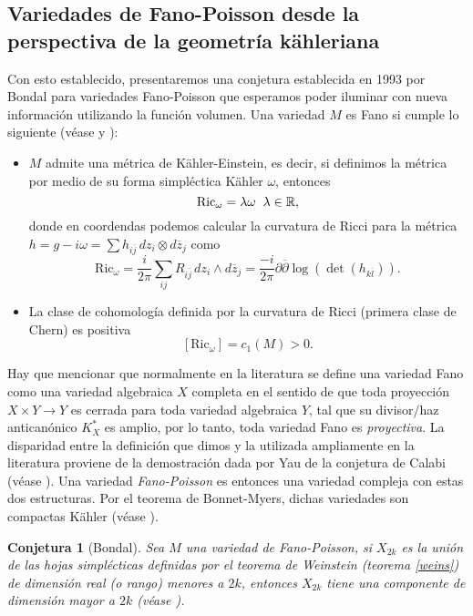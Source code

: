 \documentclass{article}
\newtheorem{conjetura}{Conjetura}
\newcommand{\re}{\ensuremath{\mathbb R }}
\begin{document}
\subsection{Variedades de Fano-Poisson desde la perspectiva de la geometr\'ia k\"ahleriana}
\noindent Con esto establecido, presentaremos una conjetura establecida en 1993 por Bondal para variedades Fano-Poisson que esperamos poder 
iluminar con nueva informaci\'on utilizando la funci\'on volumen. Una variedad $M$ es Fano si cumple lo siguiente 
(v\'ease \cite{S-Yau} y \cite{ZB}):
\begin{itemize}
        \item $M$ admite una m\'etrica de K\"ahler-Einstein, es decir, si definimos la m\'etrica por medio de su forma simpl\'ectica 
        K\"ahler $\omega$, entonces
                $$\textrm{Ric}_{\omega}=\lambda\omega\hspace{0.2cm}\lambda\in\re,$$
        donde en coordendas podemos calcular la curvatura de Ricci para la m\'etrica 
        \hbox{$h=g-i\omega=\sum h_{i\overline{j}}\,dz_i\otimes d\overline{z}_j$} como
        $$\textrm{Ric}_{\omega}=\frac{i}{2\pi}\sum_{ij}R_{i\overline{j}}\,dz_i\wedge d\overline{z}_j=\frac{-i}{2\pi}\partial\overline{\partial}\log(\det(h_{k\overline{l}})).$$
        \item La clase de cohomolog\'ia definida por la curvatura de Ricci (primera clase de Chern) es positiva
        $$
        [\textrm{Ric}_{\omega}]=c_1(M)>0.
        $$
\end{itemize}
\noindent Hay que mencionar que normalmente en la literatura se define una variedad Fano como una variedad algebraica $X$ completa 
en el sentido de que toda proyecci\'on $X\times Y\rightarrow Y$ es cerrada para toda variedad algebraica $Y$, tal que su divisor/haz antican\'onico
$K^{*}_{X}$ es amplio, por lo tanto, toda variedad Fano es \emph{proyectiva}. La disparidad entre la definici\'on que dimos y la utilizada 
ampliamente en la literatura proviene de la demostraci\'on dada por Yau de la conjetura de Calabi (v\'ease \cite{S-Yau}). Una variedad
\emph{Fano-Poisson} es entonces una variedad compleja con estas dos estructuras. Por el teorema de Bonnet-Myers, dichas variedades
son compactas K\"ahler (v\'ease \cite{Myers}).
\begin{conjetura}[Bondal]\label{Bondal}
  Sea $M$ una variedad de Fano-Poisson, si $X_{2k}$ es la uni\'on de las hojas simpl\'ecticas definidas por el teorema de Weinstein (teorema \ref{weins})
  de dimensi\'on real (o rango) menores a $2k$, entonces $X_{2k}$ tiene una componente de dimensi\'on mayor a $2k$ (v\'ease \cite{Bondal}).
\end{conjetura}
\end{document}
